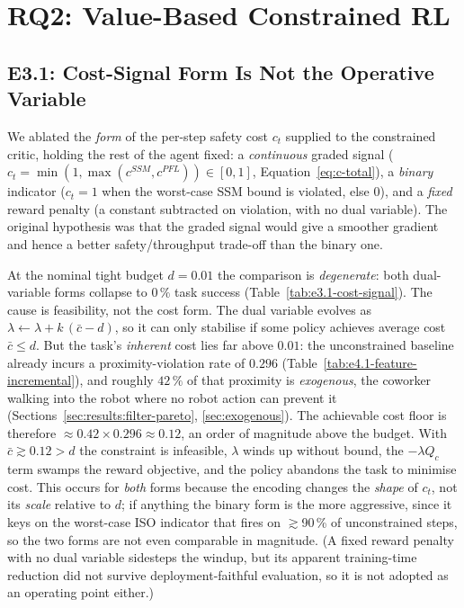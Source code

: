 \documentclass[11pt,a4paper]{report}
\newcommand{\ssm}{SSM}
\newcommand{\pfl}{PFL}
\begin{document}
\section{RQ2: Value-Based Constrained RL}
\label{sec:results:rq2}

\subsection{E3.1: Cost-Signal Form Is Not the Operative Variable}
\label{sec:results:cost-signal}

We ablated the \emph{form} of the per-step safety cost $c_t$ supplied
to the constrained critic, holding the rest of the agent fixed: a
\emph{continuous} graded signal
($c_t = \min(1,\max(c^{\ssm},c^{\pfl})) \in [0,1]$,
Equation~\ref{eq:c-total}), a \emph{binary} indicator ($c_t = 1$ when
the worst-case \ssm{} bound is violated, else $0$), and a \emph{fixed}
reward penalty (a constant subtracted on violation, with no dual
variable). The original hypothesis was that the graded signal would
give a smoother gradient and hence a better safety/throughput trade-off
than the binary one.

At the nominal tight budget $d = 0.01$ the comparison is
\emph{degenerate}: both dual-variable forms collapse to $0\,\%$ task
success (Table~\ref{tab:e3.1-cost-signal}). The cause is feasibility,
not the cost form. The dual variable evolves as
$\lambda \leftarrow \lambda + k\,(\bar c - d)$, so it can only
stabilise if some policy achieves average cost $\bar c \le d$. But the
task's \emph{inherent} cost lies far above $0.01$: the unconstrained
baseline already incurs a proximity-violation rate of $0.296$
(Table~\ref{tab:e4.1-feature-incremental}), and roughly $42\,\%$ of
that proximity is \emph{exogenous}, the coworker walking into the robot
where no robot action can prevent it
(Sections~\ref{sec:results:filter-pareto}, \ref{sec:exogenous}). The
achievable cost floor is therefore
$\approx 0.42 \times 0.296 \approx 0.12$, an order of magnitude above
the budget. With $\bar c \gtrsim 0.12 > d$ the constraint is
infeasible, $\lambda$ winds up without bound, the $-\lambda Q_c$ term
swamps the reward objective, and the policy abandons the task to
minimise cost. This occurs for \emph{both} forms because the encoding
changes the \emph{shape} of $c_t$, not its \emph{scale} relative to
$d$; if anything the binary form is the more aggressive, since it keys
on the worst-case ISO indicator that fires on $\gtrsim$90\,\% of
unconstrained steps, so the two forms are not even comparable in
magnitude. (A fixed reward penalty with no dual variable sidesteps the
windup, but its apparent training-time reduction did not survive
deployment-faithful evaluation, so it is not adopted as an operating
point either.)
\end{document}

